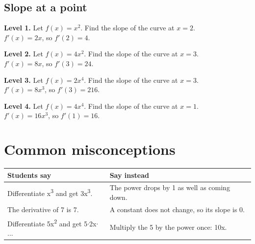 \documentclass[11pt]{article}
\begin{document}
\subsection*{Slope at a point}
\noindent\textbf{Level 1.} Let $f(x)=x^{2}$. Find the slope of the curve at $x=2$.\\  \quad $f'(x)=2x$, so $f'(2)=4$.\par\medskip
\noindent\textbf{Level 2.} Let $f(x)=4x^{2}$. Find the slope of the curve at $x=3$.\\  \quad $f'(x)=8x$, so $f'(3)=24$.\par\medskip
\noindent\textbf{Level 3.} Let $f(x)=2x^{4}$. Find the slope of the curve at $x=3$.\\  \quad $f'(x)=8x^{3}$, so $f'(3)=216$.\par\medskip
\noindent\textbf{Level 4.} Let $f(x)=4x^{4}$. Find the slope of the curve at $x=1$.\\  \quad $f'(x)=16x^{3}$, so $f'(1)=16$.\par\medskip
\section*{Common misconceptions}\begin{tabularx}{\textwidth}{@{}X X@{}}\toprule Students say & Say instead\\\midrule
Differentiate x\textsuperscript{3} and get 3x\textsuperscript{3}. & The power drops by 1 as well as coming down.\\
The derivative of 7 is 7. & A constant does not change, so its slope is 0.\\
Differentiate 5x\textsuperscript{2} and get 5$\cdot$2x$\cdot$... & Multiply the 5 by the power once: 10x.\\
\bottomrule\end{tabularx}
\end{document}
